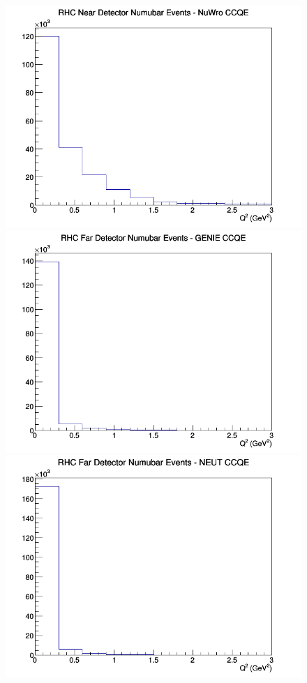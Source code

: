 \begin{figure}[h]
\includegraphics[width=\linewidth]{eff_Q2/FGT/CCQE_RHC_ND_numubar_Q2_NuWro.png}
\endminipage
\newline
{}
\includegraphics[width=\linewidth]{eff_Q2/FGT/CCQE_RHC_FD_numubar_Q2_GENIE.png}
\endminipage
{}
\includegraphics[width=\linewidth]{eff_Q2/FGT/CCQE_RHC_FD_numubar_Q2_NEUT.png}

\end{figure}

